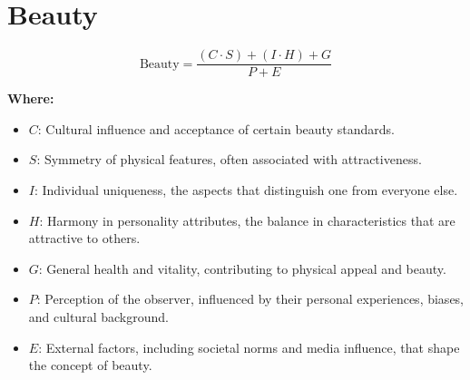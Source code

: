 \chapter{Beauty}

\begin{equation}
\text{Beauty} = \frac{(C \cdot S) + (I \cdot H) + G}{P + E}
\end{equation}

\textbf{Where:}

\begin{itemize}
    \item $C$: Cultural influence and acceptance of certain beauty standards.
    \item $S$: Symmetry of physical features, often associated with attractiveness.
    \item $I$: Individual uniqueness, the aspects that distinguish one from everyone else.
    \item $H$: Harmony in personality attributes, the balance in characteristics that are attractive to others.
    \item $G$: General health and vitality, contributing to physical appeal and beauty.
    \item $P$: Perception of the observer, influenced by their personal experiences, biases, and cultural background.
    \item $E$: External factors, including societal norms and media influence, that shape the concept of beauty.
\end{itemize}